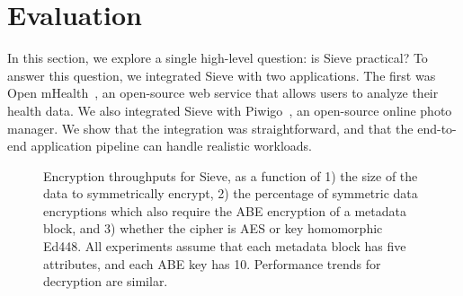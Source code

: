 \chapter{Evaluation}
\label{sec:evaluation}

In this section, we explore a single
high-level question: is Sieve practical?
To answer this question, we integrated
Sieve with two applications. The first
was Open mHealth~\cite{omh}, an open-source
web service that allows users to analyze
their health data. We also integrated Sieve
with Piwigo~\cite{piwigo}, an open-source
online photo manager. We show that the
integration was straightforward, and that
the end-to-end application pipeline can
handle realistic workloads.

\begin{figure}
\centering
    \caption[ABE throughputs for Sieve]{Encryption throughputs for Sieve, as a function of 1) the size of
             the data to symmetrically encrypt, 2) the percentage of symmetric
             data encryptions which also require the ABE encryption of a
             metadata block, and 3) whether the cipher is AES or
             key homomorphic Ed448. All experiments assume that each metadata
             block has five attributes, and each ABE key has 10. Performance
             trends for decryption are similar.}
\label{fig:throughput}
\end{figure}

